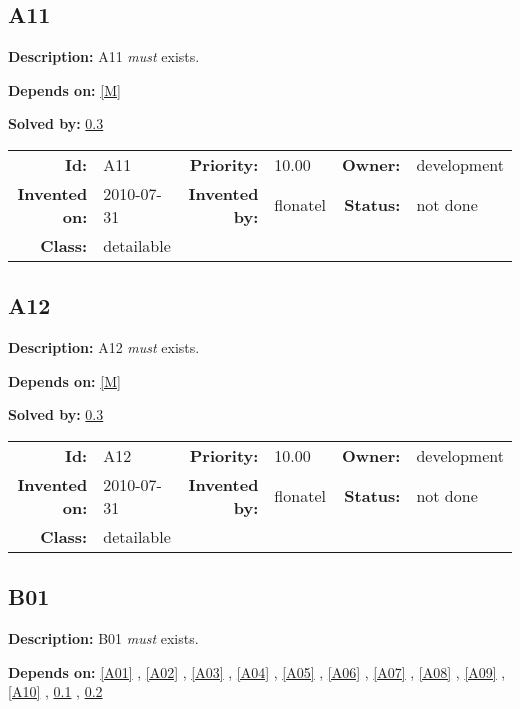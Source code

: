 \subsection{A11}\label{A11}
\textbf{Description:} A11 \textsl{must} exists.

\textbf{Depends on:} \ref{M} 

\textbf{Solved by:} \ref{B01} 

\par
{\small \begin{center}\begin{tabular}{rlrlrl}
\textbf{Id:} & A11  & \textbf{Priority:} & 10.00  & \textbf{Owner:} & development\\ 
\textbf{Invented on:} & 2010-07-31  & \textbf{Invented by:} & flonatel  & \textbf{Status:} & not done \\ 
\textbf{Class:} & detailable  & & & \end{tabular}\end{center} }

\subsection{A12}\label{A12}
\textbf{Description:} A12 \textsl{must} exists.

\textbf{Depends on:} \ref{M} 

\textbf{Solved by:} \ref{B01} 

\par
{\small \begin{center}\begin{tabular}{rlrlrl}
\textbf{Id:} & A12  & \textbf{Priority:} & 10.00  & \textbf{Owner:} & development\\ 
\textbf{Invented on:} & 2010-07-31  & \textbf{Invented by:} & flonatel  & \textbf{Status:} & not done \\ 
\textbf{Class:} & detailable  & & & \end{tabular}\end{center} }

\subsection{B01}\label{B01}
\textbf{Description:} B01 \textsl{must} exists.

\textbf{Depends on:} \ref{A01} , \ref{A02} , \ref{A03} , \ref{A04} , \ref{A05} , \ref{A06} , \ref{A07} , \ref{A08} , \ref{A09} , \ref{A10} , \ref{A11} , \ref{A12} 


